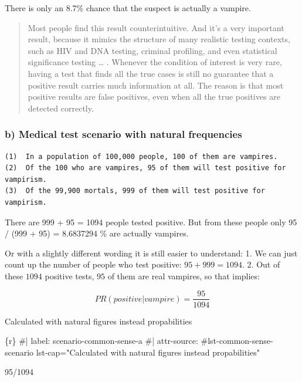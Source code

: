\documentclass[
  letterpaper,
  DIV=11,
  numbers=noendperiod]{scrreprt}
\newenvironment{Shaded}{\begin{snugshade}}{\end{snugshade}}
\newcommand{\CommentTok}[1]{\textcolor[rgb]{0.37,0.37,0.37}{#1}}
\newcommand{\DecValTok}[1]{\textcolor[rgb]{0.68,0.00,0.00}{#1}}
\newcommand{\InformationTok}[1]{\textcolor[rgb]{0.37,0.37,0.37}{#1}}
\newcommand{\SpecialCharTok}[1]{\textcolor[rgb]{0.37,0.37,0.37}{#1}}
\begin{document}
There is only an 8.7\% chance that the suspect is actually a vampire.

\begin{quote}
Most people find this result counterintuitive. And it's a very important
result, because it mimics the structure of many realistic testing
contexts, such as HIV and DNA testing, criminal profiling, and even
statistical significance testing \ldots{} . Whenever the condition of
interest is very rare, having a test that finds all the true cases is
still no guarantee that a positive result carries much information at
all. The reason is that most positive results are false positives, even
when all the true positives are detected correctly.
\end{quote}

\hypertarget{b-medical-test-scenario-with-natural-frequencies}{%
\subsubsection*{b) Medical test scenario with natural
frequencies}\label{b-medical-test-scenario-with-natural-frequencies}}

\begin{verbatim}
(1)  In a population of 100,000 people, 100 of them are vampires.
(2)  Of the 100 who are vampires, 95 of them will test positive for vampirism.
(3)  Of the 99,900 mortals, 999 of them will test positive for vampirism.
\end{verbatim}

There are 999 + 95 = 1094 people tested positive. But from these people
only 95 / (999 + 95) = 8.6837294 \% are actually vampires.

Or with a slightly different wording it is still easier to understand:
1. We can just count up the number of people who test positive:
\(95 + 999 = 1094\). 2. Out of these \(1094\) positive tests, \(95\) of
them are real vampires, so that implies:

\[
PR(positive|vampire) = \frac{95}{1094}
\]

\begin{codelisting}

\caption{Calculated with natural figures instead propabilities}

\hypertarget{lst-common-sense-scenario}{%
\label{lst-common-sense-scenario}}%
\begin{Shaded}
\begin{Highlighting}[]
\InformationTok{\textasciigrave{}\textasciigrave{}\textasciigrave{}\{r\}}
\CommentTok{\#| label: scenario{-}common{-}sense{-}a}
\CommentTok{\#| attr{-}source: \textquotesingle{}\#lst{-}common{-}sense{-}scenario lst{-}cap="Calculated with natural figures instead propabilities"\textquotesingle{}}

\DecValTok{95}\SpecialCharTok{/}\DecValTok{1094}
\InformationTok{\textasciigrave{}\textasciigrave{}\textasciigrave{}}
\end{Highlighting}
\end{Shaded}

\end{codelisting}
\end{document}

